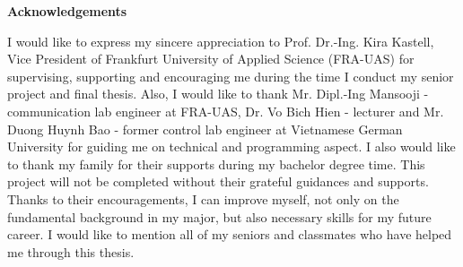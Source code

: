 \begin{center}\textbf{Acknowledgements}\end{center}
{
	\par
	I would like to express my sincere appreciation to Prof. Dr.-Ing. Kira Kastell, Vice President of Frankfurt University of Applied Science (FRA-UAS) for supervising, supporting and encouraging me during the time I conduct my senior project and final thesis. Also, I would like to thank Mr. Dipl.-Ing Mansooji - communication lab engineer at FRA-UAS, Dr. Vo Bich Hien - lecturer and Mr. Duong Huynh Bao - former control lab engineer at Vietnamese German University for guiding me on technical and programming aspect. I also would like to thank my family for their supports during my bachelor degree time. This project will not be completed without their grateful guidances and supports. Thanks to their encouragements, I can improve myself, not only on the fundamental background in my major, but also necessary skills for my future career. I would like to mention all of my seniors and classmates who have helped me through this thesis.\par
	\vspace{1cm}
}
\cleardoublepage



\renewcommand\contentsname{Table of Contents}
\tableofcontents
\cleardoublepage
{}

\listoftables
\cleardoublepage
{}		%

\listoffigures
\cleardoublepage
{}		%




